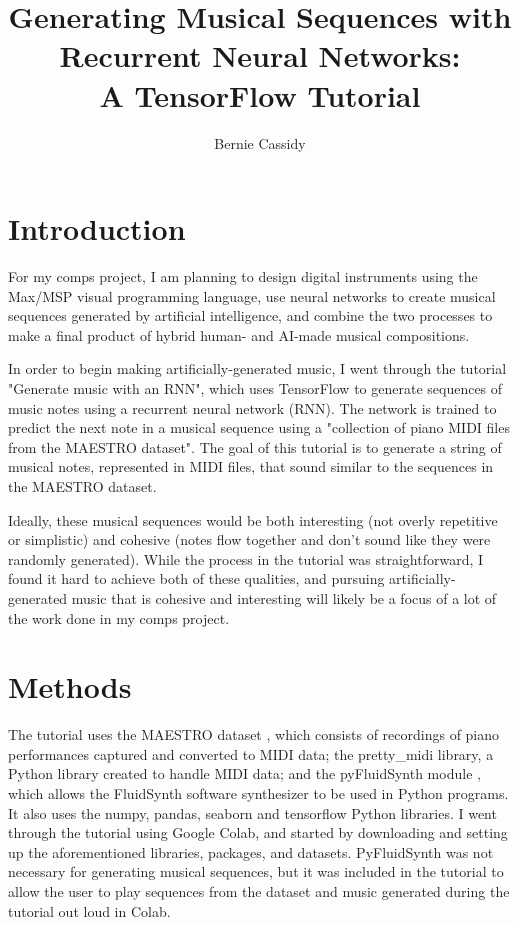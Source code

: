 \documentclass[10pt,twocolumn]{article}
\title{Generating Musical Sequences with Recurrent Neural Networks: \\ A TensorFlow Tutorial}
\author{Bernie Cassidy}
\affiliation{Occidental College}
\begin{document}
\maketitle

\section{Introduction}

For my comps project, I am planning to design digital instruments using the Max/MSP visual programming language, use neural networks to create musical sequences generated by artificial intelligence, and combine the two processes to make a final product of hybrid human- and AI-made musical compositions.

In order to begin making artificially-generated music, I went through the tutorial "Generate music with an RNN", which uses TensorFlow to generate sequences of music notes using a recurrent neural network (RNN). The network is trained to predict the next note in a musical sequence using a "collection of piano MIDI files from the MAESTRO dataset". \cite{TensorFlow2021GenerateMusic} The goal of this tutorial is to generate a string of musical notes, represented in MIDI files, that sound similar to the sequences in the MAESTRO dataset.

Ideally, these musical sequences would be both interesting (not overly repetitive or simplistic) and cohesive (notes flow together and don't sound like they were randomly generated). While the process in the tutorial was straightforward, I found it hard to achieve both of these qualities, and pursuing artificially-generated music that is cohesive and interesting will likely be a focus of a lot of the work done in my comps project.


\section{Methods}

The tutorial uses the MAESTRO dataset \cite{hawthorne2018enabling}, which consists of recordings of piano performances captured and converted to MIDI data; the pretty\_midi library\cite{prettyMIDI}, a Python library created to handle MIDI data; and the pyFluidSynth module \cite{pyFluidSynth}, which allows the FluidSynth software synthesizer to be used in Python programs. It also uses the numpy, pandas, seaborn and tensorflow Python libraries. I went through the tutorial using Google Colab, and started by downloading and setting up the aforementioned libraries, packages, and datasets. PyFluidSynth was not necessary for generating musical sequences, but it was included in the tutorial to allow the user to play sequences from the dataset and music generated during the tutorial out loud in Colab. 
\end{document}

